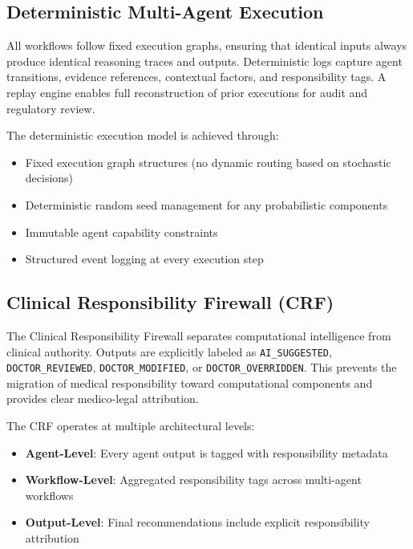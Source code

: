 \documentclass[journal]{IEEEtran}
\begin{document}
\subsection{Deterministic Multi-Agent Execution}
All workflows follow fixed execution graphs, ensuring that identical inputs always produce identical reasoning traces and outputs. Deterministic logs capture agent transitions, evidence references, contextual factors, and responsibility tags. A replay engine enables full reconstruction of prior executions for audit and regulatory review.

The deterministic execution model is achieved through:
\begin{itemize}
    \item Fixed execution graph structures (no dynamic routing based on stochastic decisions)
    \item Deterministic random seed management for any probabilistic components
    \item Immutable agent capability constraints
    \item Structured event logging at every execution step
\end{itemize}

\subsection{Clinical Responsibility Firewall (CRF)}
The Clinical Responsibility Firewall separates computational intelligence from clinical authority. Outputs are explicitly labeled as \texttt{AI\_SUGGESTED}, \texttt{DOCTOR\_REVIEWED}, \texttt{DOCTOR\_MODIFIED}, or \texttt{DOCTOR\_OVERRIDDEN}. This prevents the migration of medical responsibility toward computational components and provides clear medico-legal attribution.

The CRF operates at multiple architectural levels:
\begin{itemize}
    \item \textbf{Agent-Level}: Every agent output is tagged with responsibility metadata
    \item \textbf{Workflow-Level}: Aggregated responsibility tags across multi-agent workflows
    \item \textbf{Output-Level}: Final recommendations include explicit responsibility attribution
\end{itemize}
\end{document}
